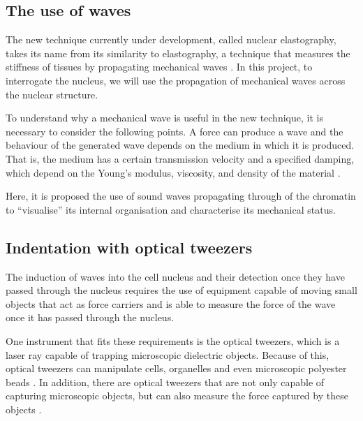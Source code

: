 \documentclass[12pt, a4paper]{article} %
\begin{document}
 \newpage
 
 \setlength{\parskip}{0mm}

\subsection{The use of waves}

The new technique currently under development, called nuclear elastography, takes its name from its similarity to elastography, a technique that measures the stiffness of tissues by propagating mechanical waves \cite{gennisson2013ultrasound}. In this project, to interrogate the nucleus, we will use the propagation of mechanical waves across the nuclear structure.

\setlength{\parskip}{4mm}

To understand why a mechanical wave is useful in the new technique, it is necessary to consider the following points. A force can produce a wave and the behaviour of the generated wave depends on the medium in which it is produced. That is, the medium has a certain transmission velocity and a specified damping, which depend on the Young's modulus, viscosity, and density of the material \cite{achenbach2012wave}. 

Here, it is proposed the use of sound waves propagating through of the chromatin to “visualise” its internal organisation and characterise its mechanical status.

\setlength{\parskip}{0mm}

\subsection{Indentation with optical tweezers}

The induction of waves into the cell nucleus and their detection once they have passed through the nucleus requires the use of equipment capable of moving small objects that act as force carriers and is able to measure the force of the wave once it has passed through the nucleus. 

\setlength{\parskip}{4mm}

One instrument that fits these requirements is the optical tweezers, which is a laser ray capable of trapping microscopic dielectric objects. Because of this, optical tweezers can manipulate cells, organelles and even microscopic polyester beads \cite{novotny1997theory, ombid2020vitro, ashkin1992forces}. In addition, there are optical tweezers that are not only capable of capturing microscopic objects, but can also measure the force captured by these objects \cite{farre2014force}. 
\end{document}

